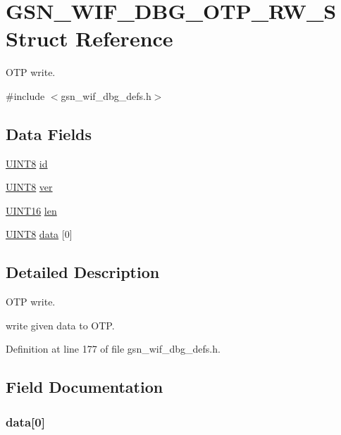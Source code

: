 \hypertarget{a00332}{
\section{GSN\_\-WIF\_\-DBG\_\-OTP\_\-RW\_\-S Struct Reference}
\label{a00332}
}


OTP write.  




{\ttfamily \#include $<$gsn\_\-wif\_\-dbg\_\-defs.h$>$}

\subsection*{Data Fields}
\begin{DoxyCompactItemize}
\item 
\hyperlink{a00660_gab27e9918b538ce9d8ca692479b375b6a}{UINT8} \hyperlink{a00332_a583a14d715339a2c22d205223d366263}{id}
\item 
\hyperlink{a00660_gab27e9918b538ce9d8ca692479b375b6a}{UINT8} \hyperlink{a00332_a2ac44d771c9e31ef7508150a7082e8cf}{ver}
\item 
\hyperlink{a00660_ga09f1a1fb2293e33483cc8d44aefb1eb1}{UINT16} \hyperlink{a00332_ab3bcead9c261261394a5d9b3bf8f95cb}{len}
\item 
\hyperlink{a00660_gab27e9918b538ce9d8ca692479b375b6a}{UINT8} \hyperlink{a00332_a29500e452cff835f2b70d1dff36f918a}{data} \mbox{[}0\mbox{]}
\end{DoxyCompactItemize}


\subsection{Detailed Description}
OTP write. 

write given data to OTP. 

Definition at line 177 of file gsn\_\-wif\_\-dbg\_\-defs.h.



\subsection{Field Documentation}
\hypertarget{a00332_a29500e452cff835f2b70d1dff36f918a}{
\subsubsection[{data}]{ {\bf data}\mbox{[}0\mbox{]}}}
\label{a00332_a29500e452cff835f2b70d1dff36f918a}


